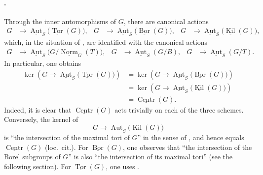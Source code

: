 \paragraph{.}
Through the inner automorphisms of \(G\), there are canonical actions
\[
\begin{aligned}
  G&\longrightarrow
  \underline{\operatorname{Aut}}_S
  \bigl(\underline{\operatorname{Tor}}(G)\bigr),
  &
  G&\longrightarrow
  \underline{\operatorname{Aut}}_S
  \bigl(\underline{\operatorname{Bor}}(G)\bigr),
  &
  G&\longrightarrow
  \underline{\operatorname{Aut}}_S
  \bigl(\underline{\operatorname{Kil}}(G)\bigr),
\end{aligned}
\]
which, in the situation of \textup{}, are identified with
the canonical actions
\[
\begin{aligned}
  G&\longrightarrow
  \underline{\operatorname{Aut}}_S
  \bigl(G/\underline{\operatorname{Norm}}_G(T)\bigr),
  &
  G&\longrightarrow
  \underline{\operatorname{Aut}}_S(G/B),
  &
  G&\longrightarrow
  \underline{\operatorname{Aut}}_S(G/T).
\end{aligned}
\]
In particular, one obtains
\[
\begin{aligned}
  \ker\!\left(
    G\longrightarrow
    \underline{\operatorname{Aut}}_S
    \bigl(\underline{\operatorname{Tor}}(G)\bigr)
  \right)
  &=
  \ker\!\left(
    G\longrightarrow
    \underline{\operatorname{Aut}}_S
    \bigl(\underline{\operatorname{Bor}}(G)\bigr)
  \right)\\
  &=
  \ker\!\left(
    G\longrightarrow
    \underline{\operatorname{Aut}}_S
    \bigl(\underline{\operatorname{Kil}}(G)\bigr)
  \right)\\
  &=
  \underline{\operatorname{Centr}}(G).
\end{aligned}
\]
Indeed, it is clear that \(\underline{\operatorname{Centr}}(G)\)
acts trivially on each of the three schemes. Conversely, the kernel
of
\[
  G\longrightarrow
  \underline{\operatorname{Aut}}_S
  \bigl(\underline{\operatorname{Kil}}(G)\bigr)
\]
is ``the intersection of the maximal tori of \(G\)'' in the sense of
, and hence equals
\(\underline{\operatorname{Centr}}(G)\) \textup{(loc.\ cit.)}. For
\(\underline{\operatorname{Bor}}(G)\), one observes that ``the
intersection of the Borel subgroups of \(G\)'' is also ``the
intersection of its maximal tori'' \textup{(see the following
section)}. For \(\underline{\operatorname{Tor}}(G)\), one uses
.

